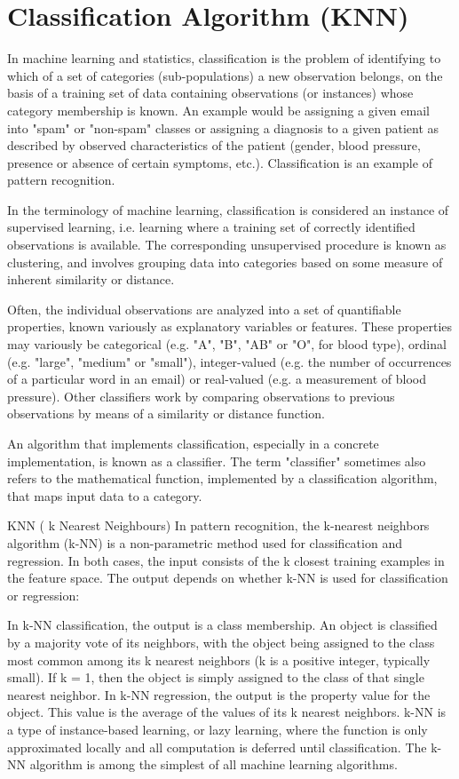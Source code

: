 \section{Classification Algorithm (KNN)}{
In machine learning and statistics, classification is the problem of identifying to which of a set of categories (sub-populations) a new observation belongs, on the basis of a training set of data containing observations (or instances) whose category membership is known. An example would be assigning a given email into "spam" or "non-spam" classes or assigning a diagnosis to a given patient as described by observed characteristics of the patient (gender, blood pressure, presence or absence of certain symptoms, etc.). Classification is an example of pattern recognition.

In the terminology of machine learning, classification is considered an instance of supervised learning, i.e. learning where a training set of correctly identified observations is available. The corresponding unsupervised procedure is known as clustering, and involves grouping data into categories based on some measure of inherent similarity or distance.

Often, the individual observations are analyzed into a set of quantifiable properties, known variously as explanatory variables or features. These properties may variously be categorical (e.g. "A", "B", "AB" or "O", for blood type), ordinal (e.g. "large", "medium" or "small"), integer-valued (e.g. the number of occurrences of a particular word in an email) or real-valued (e.g. a measurement of blood pressure). Other classifiers work by comparing observations to previous observations by means of a similarity or distance function.

An algorithm that implements classification, especially in a concrete implementation, is known as a classifier. The term "classifier" sometimes also refers to the mathematical function, implemented by a classification algorithm, that maps input data to a category.
 
KNN ( k Nearest Neighbours)
In pattern recognition, the k-nearest neighbors algorithm (k-NN) is a non-parametric method used for classification and regression. In both cases, the input consists of the k closest training examples in the feature space. The output depends on whether k-NN is used for classification or regression:

In k-NN classification, the output is a class membership. An object is classified by a majority vote of its neighbors, with the object being assigned to the class most common among its k nearest neighbors (k is a positive integer, typically small). If k = 1, then the object is simply assigned to the class of that single nearest neighbor.
In k-NN regression, the output is the property value for the object. This value is the average of the values of its k nearest neighbors.
k-NN is a type of instance-based learning, or lazy learning, where the function is only approximated locally and all computation is deferred until classification. The k-NN algorithm is among the simplest of all machine learning algorithms.

}

